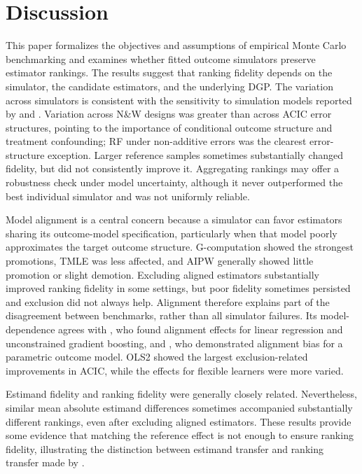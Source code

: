 \section{Discussion}
\label{sec:discussion}

This paper formalizes the objectives and assumptions of empirical Monte Carlo benchmarking and examines whether fitted outcome simulators preserve estimator rankings. The results suggest that ranking fidelity depends on the simulator, the candidate estimators, and the underlying DGP. The variation across simulators is consistent with the sensitivity to simulation models reported by  and . Variation across N\&W designs was greater than across ACIC error structures, pointing to the importance of conditional outcome structure and treatment confounding; RF under non-additive errors was the clearest error-structure exception. Larger reference samples sometimes substantially changed fidelity, but did not consistently improve it. Aggregating rankings may offer a robustness check under model uncertainty, although it never outperformed the best individual simulator and was not uniformly reliable.

Model alignment is a central concern because a simulator can favor estimators sharing its outcome-model specification, particularly when that model poorly approximates the target outcome structure. G-computation showed the strongest promotions, TMLE was less affected, and AIPW generally showed little promotion or slight demotion. Excluding aligned estimators substantially improved ranking fidelity in some settings, but poor fidelity sometimes persisted and exclusion did not always help. Alignment therefore explains part of the disagreement between benchmarks, rather than all simulator failures. Its model-dependence agrees with , who found alignment effects for linear regression and unconstrained gradient boosting, and , who demonstrated alignment bias for a parametric outcome model. OLS2 showed the largest exclusion-related improvements in ACIC, while the effects for flexible learners were more varied.

Estimand fidelity and ranking fidelity were generally closely related. Nevertheless, similar mean absolute estimand differences sometimes accompanied substantially different rankings, even after excluding aligned estimators. These results provide some evidence that matching the reference effect is not enough to ensure ranking fidelity, illustrating the distinction between estimand transfer and ranking transfer made by .

